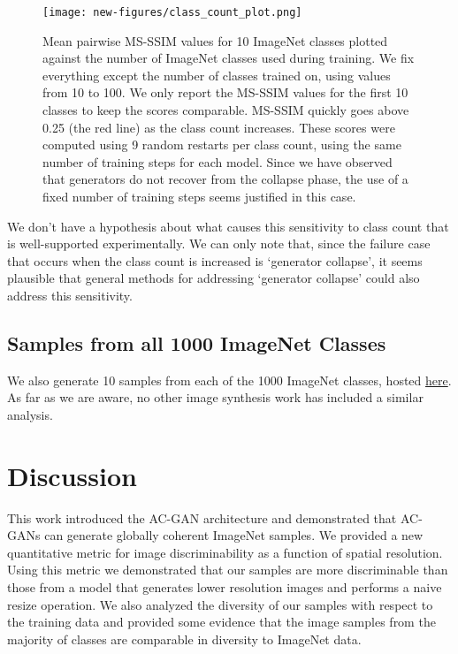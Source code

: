 \documentclass{article}
\begin{document}
\begin{figure}[!h]
\texttt{[image: new-figures/class\_count\_plot.png]}
\centering
\caption{Mean pairwise MS-SSIM values for 10 ImageNet classes plotted
  against the number of ImageNet classes used during training.
  We fix everything except the number of classes trained on,
  using values from 10 to 100.
  We only report the MS-SSIM values for the first 10 classes
  to keep the scores comparable.
  MS-SSIM quickly goes above 0.25 (the red line) as the class count
  increases.
  These scores were computed using 9 random restarts per class count,
  using the same number of training steps for each model.
  Since we have observed that generators do not recover from the collapse phase,
  the use of a fixed number of training steps seems justified in this case.
}
\label{fig:classcount}
\end{figure}


We don't have a hypothesis about what causes this sensitivity to class count that is well-supported experimentally.
We can only note that, since the failure case that occurs when the class count is increased is `generator collapse',
it seems plausible that general methods for addressing `generator collapse' could also address this sensitivity.

\subsection{Samples from all 1000 ImageNet Classes}

We also generate 10 samples from each of the 1000 ImageNet classes, hosted
\href{https://goo.gl/photos/8bgHBkCwDEVTXAPaA}{here}.
As far as we are aware, no other image synthesis work has included a similar analysis.









\section{Discussion}

This work introduced the AC-GAN architecture and demonstrated that AC-GANs
can generate globally coherent ImageNet samples.
We provided a new quantitative metric for image discriminability as a
function of spatial resolution.
Using this metric we demonstrated that our samples are more discriminable than
 those from a model
that generates lower resolution images and performs a naive resize operation.
We also analyzed the diversity of our samples with respect to the training data and 
provided some evidence that the image samples from the majority of classes are
comparable in diversity to ImageNet data.
\end{document}

